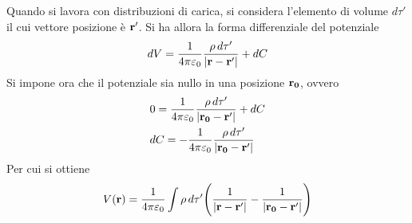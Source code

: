 Quando si lavora con distribuzioni di carica, si considera l'elemento di volume $d\tau'$ il cui vettore posizione è
$\vb{r'}$. Si ha allora la forma differenziale del potenziale
\[
    dV=\frac{1}{4\pi\varepsilon_0}\frac{\rho\,d\tau'}{\abs{\vb{r}-\vb{r'}}}+dC
\]
Si impone ora che il potenziale sia nullo in una posizione $\vb{r_0}$, ovvero
\[
    \begin{split}
        & 0=\frac{1}{4\pi\varepsilon_0}\frac{\rho\,d\tau'}{\abs{\vb{r_0}-\vb{r'}}}+dC \\
        & dC=-\frac{1}{4\pi\varepsilon_0}\frac{\rho\,d\tau'}{\abs{\vb{r_0}-\vb{r'}}}
    \end{split}
\]
Per cui si ottiene
\begin{equation}
    \label{eqn:V_rho}
    V(\vb{r})=\frac{1}{4\pi\varepsilon_0}\int\rho\,d\tau'\Biggl(\frac{1}{\abs{\vb{r}-\vb{r'}}} - \frac{1}{\abs{\vb{r_0}-\vb{r'}}}\Biggr)
\end{equation}
